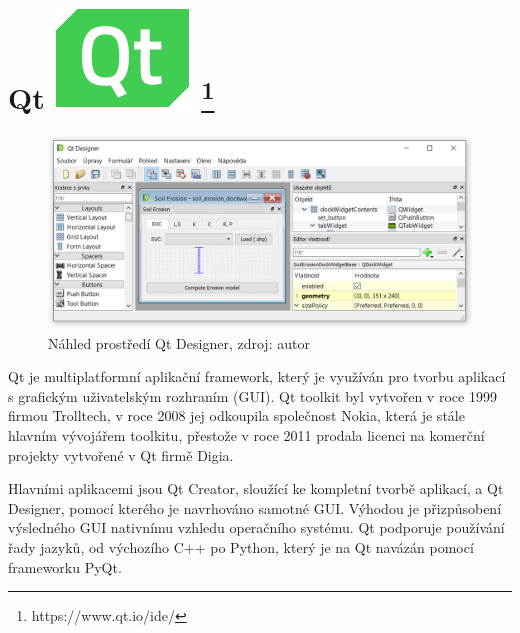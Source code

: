 \section[Qt]{Qt \includegraphics[scale=0.20]{./pictures/qt.png} 
\footnote{https://www.qt.io/ide/}}
\label{qt}
\begin{figure}[H]
    \centering \includegraphics[scale=0.6]{./pictures/qt_screen.png}
      \caption[Náhled prostředí Qt Designer]
      {Náhled prostředí Qt Designer, zdroj: autor}
      \label{screen:qt}
\end{figure}
Qt je multiplatformní aplikační framework, který je využíván pro
tvorbu aplikací s grafickým uživatelským rozhraním (GUI). Qt toolkit
byl vytvořen v roce 1999 firmou Trolltech, v roce 2008 jej odkoupila
společnost Nokia, která je stále hlavním vývojářem toolkitu, přestože
v roce 2011 prodala licenci na komerční projekty vytvořené v Qt firmě
Digia.

Hlavními aplikacemi jsou Qt Creator, sloužící ke kompletní tvorbě
aplikací, a Qt Designer, pomocí kterého je navrhováno samotné
GUI. Výhodou je přizpůsobení výsledného GUI nativnímu vzhledu
operačního systému. Qt podporuje používání řady jazyků, od výchozího
C++ po Python, který je na Qt navázán pomocí frameworku PyQt.\cite{qt}
\cite{rapidPyQt}
